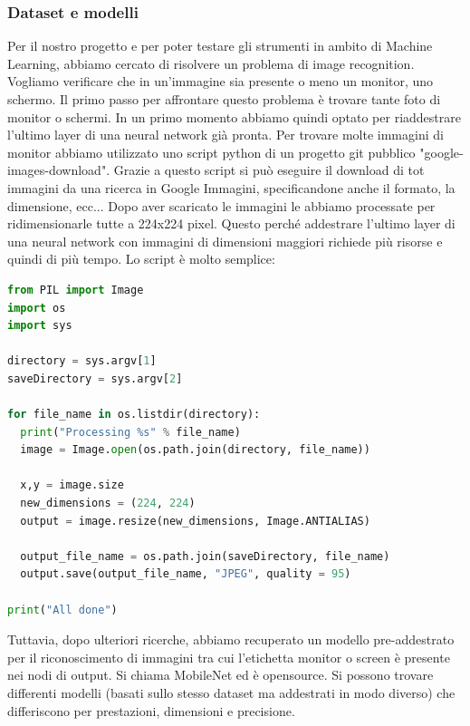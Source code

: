 \documentclass[twoside]{supsistudent}
\begin{document}
\subsubsection{Dataset e modelli}%
Per il nostro progetto e per poter testare gli strumenti in ambito di Machine Learning, abbiamo cercato di risolvere un problema di image recognition. Vogliamo verificare che in un'immagine sia presente o meno un monitor, uno schermo. Il primo passo per affrontare questo problema è trovare tante foto di monitor o schermi. In un primo momento abbiamo quindi optato per riaddestrare l'ultimo layer di una neural network già pronta. 
Per trovare molte immagini di monitor abbiamo utilizzato uno script python di un progetto git pubblico\cite{googleDown} "google-images-download". Grazie a questo script si può eseguire il download di tot immagini da una ricerca in Google Immagini, specificandone anche il formato, la dimensione, ecc... Dopo aver scaricato le immagini le abbiamo processate per ridimensionarle tutte a 224x224 pixel. Questo perché addestrare l'ultimo layer di una neural network con immagini di dimensioni maggiori richiede più risorse e quindi di più tempo. Lo script è molto semplice:
\begin{lstlisting}[language=Python]
from PIL import Image
import os
import sys

directory = sys.argv[1]
saveDirectory = sys.argv[2]

for file_name in os.listdir(directory):
  print("Processing %s" % file_name)
  image = Image.open(os.path.join(directory, file_name))

  x,y = image.size
  new_dimensions = (224, 224)
  output = image.resize(new_dimensions, Image.ANTIALIAS)

  output_file_name = os.path.join(saveDirectory, file_name)
  output.save(output_file_name, "JPEG", quality = 95)

print("All done")
\end{lstlisting}

Tuttavia, dopo ulteriori ricerche, abbiamo recuperato un modello pre-addestrato per il riconoscimento di immagini tra cui l'etichetta monitor o screen è presente nei nodi di output. Si chiama MobileNet\cite{mobileNet} ed è opensource. Si possono trovare differenti modelli (basati sullo stesso dataset ma addestrati in modo diverso) che differiscono per prestazioni, dimensioni e precisione.
\end{document}
